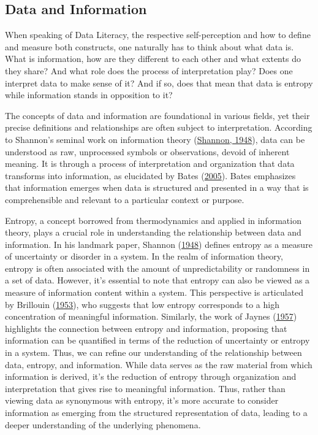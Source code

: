 \documentclass[
  12pt,
  a4paper,
  twoside]{article}
\begin{document}
\hypertarget{data-and-information}{%
\subsection{Data and Information}\label{data-and-information}}

When speaking of Data Literacy, the respective self-perception and how to define and measure both constructs, one naturally has to think about what data is. What is information, how are they different to each other and what extents do they share? And what role does the process of interpretation play? Does one interpret data to make sense of it? And if so, does that mean that data is entropy while information stands in opposition to it?

The concepts of data and information are foundational in various fields, yet their precise definitions and relationships are often subject to interpretation.
According to Shannon's seminal work on information theory (\protect\hyperlink{ref-shannon1948}{Shannon, 1948}), data can be understood as raw, unprocessed symbols or observations, devoid of inherent meaning. It is through a process of interpretation and organization that data transforms into information, as elucidated by Bates (\protect\hyperlink{ref-bates2005}{2005}). Bates emphasizes that information emerges when data is structured and presented in a way that is comprehensible and relevant to a particular context or purpose.

Entropy, a concept borrowed from thermodynamics and applied in information theory, plays a crucial role in understanding the relationship between data and information. In his landmark paper, Shannon (\protect\hyperlink{ref-shannon1948}{1948}) defines entropy as a measure of uncertainty or disorder in a system. In the realm of information theory, entropy is often associated with the amount of unpredictability or randomness in a set of data.
However, it's essential to note that entropy can also be viewed as a measure of information content within a system. This perspective is articulated by Brillouin (\protect\hyperlink{ref-brillouin1953}{1953}), who suggests that low entropy corresponds to a high concentration of meaningful information. Similarly, the work of Jaynes (\protect\hyperlink{ref-jaynes1957}{1957}) highlights the connection between entropy and information, proposing that information can be quantified in terms of the reduction of uncertainty or entropy in a system.
Thus, we can refine our understanding of the relationship between data, entropy, and information. While data serves as the raw material from which information is derived, it's the reduction of entropy through organization and interpretation that gives rise to meaningful information. Thus, rather than viewing data as synonymous with entropy, it's more accurate to consider information as emerging from the structured representation of data, leading to a deeper understanding of the underlying phenomena.
\end{document}
